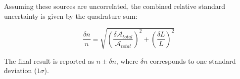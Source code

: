 Assuming these sources are uncorrelated, the combined relative standard uncertainty is given by the quadrature sum:

\begin{equation}
    \frac{\delta n}{n} = \sqrt{ \left( \frac{\delta \mathcal{A}_{total}}{\mathcal{A}_{total}} \right)^2 + \left( \frac{\delta L}{L} \right)^2 }
\end{equation}

The final result is reported as $n \pm \delta n$, where $\delta n$ corresponds to one standard deviation ($1\sigma$).